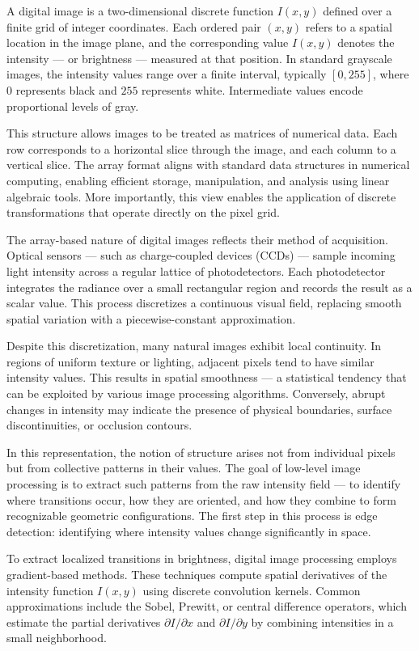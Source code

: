A digital image is a two-dimensional discrete function $I(x, y)$ defined over a finite grid of integer coordinates. Each ordered pair $(x, y)$ refers to a spatial location in the image plane, and the corresponding value $I(x, y)$ denotes the intensity — or brightness — measured at that position. In standard grayscale images, the intensity values range over a finite interval, typically $[0, 255]$, where $0$ represents black and $255$ represents white. Intermediate values encode proportional levels of gray.

This structure allows images to be treated as matrices of numerical data. Each row corresponds to a horizontal slice through the image, and each column to a vertical slice. The array format aligns with standard data structures in numerical computing, enabling efficient storage, manipulation, and analysis using linear algebraic tools. More importantly, this view enables the application of discrete transformations that operate directly on the pixel grid.

The array-based nature of digital images reflects their method of acquisition. Optical sensors — such as charge-coupled devices (CCDs) — sample incoming light intensity across a regular lattice of photodetectors. Each photodetector integrates the radiance over a small rectangular region and records the result as a scalar value. This process discretizes a continuous visual field, replacing smooth spatial variation with a piecewise-constant approximation.

Despite this discretization, many natural images exhibit local continuity. In regions of uniform texture or lighting, adjacent pixels tend to have similar intensity values. This results in spatial smoothness — a statistical tendency that can be exploited by various image processing algorithms. Conversely, abrupt changes in intensity may indicate the presence of physical boundaries, surface discontinuities, or occlusion contours.

In this representation, the notion of structure arises not from individual pixels but from collective patterns in their values. The goal of low-level image processing is to extract such patterns from the raw intensity field — to identify where transitions occur, how they are oriented, and how they combine to form recognizable geometric configurations. The first step in this process is edge detection: identifying where intensity values change significantly in space.

To extract localized transitions in brightness, digital image processing employs gradient-based methods. These techniques compute spatial derivatives of the intensity function $I(x, y)$ using discrete convolution kernels. Common approximations include the Sobel, Prewitt, or central difference operators, which estimate the partial derivatives $\partial I / \partial x$ and $\partial I / \partial y$ by combining intensities in a small neighborhood.


